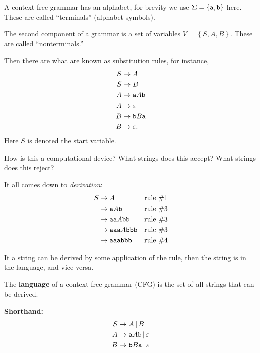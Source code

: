 \documentclass{notes}
\begin{document}
\begin{eg}
  A context-free grammar has an alphabet, for brevity we use $\Sigma = \left \{ \verb~a~, \verb~b~ \right \}$ here.
  These are called ``terminals'' (alphabet symbols).
  
  The second component of a grammar is a set of variables $V = \left \{ S, A, B \right \}$.
  These are called ``nonterminals.''
  
  Then there are what are known as substitution rules, for instance, 
  \begin{align*}
    S &\to A \\ 
    S &\to B \\ 
    A &\to \verb~a~ A \verb~b~ \\ 
    A &\to \varepsilon \\ 
    B &\to \verb~b~ B \verb~a~ \\ 
    B &\to \varepsilon.
  \end{align*}
  Here $S$ is denoted the start variable.
  
  How is this a computational device? What strings does this accept? What strings does this reject?

  It all comes down to \textit{derivation}: 
  \begin{align*}
    S &\to A & \text{rule \#1} \\ 
    &\to \verb~a~ A \verb~b~ & \text{rule \#3} \\ 
    &\to \verb~aa~ A \verb~bb~ & \text{rule \#3} \\ 
    &\to \verb~aaa~ A \verb~bbb~ & \text{rule \#3} \\ 
    &\to \verb~aaabbb~ & \text{rule \#4} 
  \end{align*}
  
  It a string can be derived by some application of the rule, then the string is in the language, and vice versa.
\end{eg}

\begin{defn}
  The {\boldmath \bfseries language} of a context-free grammar (CFG) is the set of all strings that can be derived.
\end{defn}

{\boldmath \bfseries Shorthand:} 
\begin{align*}
  S &\to A \, | \, B \\ 
  A &\to \verb~a~ A \verb~b~ \, | \, \varepsilon \\ 
  B &\to \verb~b~ B \verb~a~ \, | \, \varepsilon
\end{align*}
\end{document}

